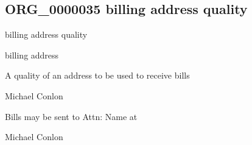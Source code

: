 \documentclass[letterpaper,10pt,english]{sphinxmanual}
\begin{document}
\subsection{ORG\_0000035 \sphinxhyphen{} billing address quality}
\label{\detokenize{doc-ORG_0000035:org-0000035-billing-address-quality}}\label{\detokenize{doc-ORG_0000035:index-0}}\label{\detokenize{doc-ORG_0000035::doc}}
\begin{sphinxShadowBox}

\sphinxAtStartPar
billing address quality
\end{sphinxShadowBox}

\begin{sphinxShadowBox}

\sphinxAtStartPar
billing address
\end{sphinxShadowBox}

\begin{sphinxShadowBox}

\sphinxAtStartPar
{\hyperref[\detokenize{doc-BFO_0000019::doc}]{}}
\end{sphinxShadowBox}

\begin{sphinxShadowBox}

\sphinxAtStartPar
A quality of an address to be used to receive bills
\end{sphinxShadowBox}

\begin{sphinxShadowBox}

\sphinxAtStartPar
Michael Conlon 
\end{sphinxShadowBox}

\begin{sphinxShadowBox}

\sphinxAtStartPar
Bills may be sent to Attn: Name at
\end{sphinxShadowBox}

\begin{sphinxShadowBox}

\sphinxAtStartPar
Michael Conlon 
\end{sphinxShadowBox}
\begin{quote}

\ignorespaces \end{quote}
\end{document}
